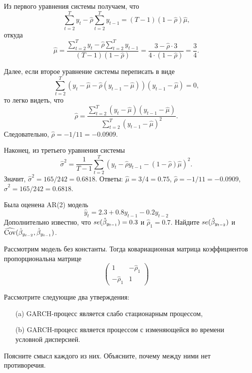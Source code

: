\documentclass[pdftex,11pt,openany]{book}\usepackage[]{graphicx}\usepackage[]{color}
\begin{document}
\begin{solution}
Из первого уравнения системы получаем, что
\[
\sum_{t=2}^{T}y_{t} - \hat{\rho} \sum_{t=2}^{T}y_{t-1} = (T - 1) (1- \hat{\rho}) \hat{\mu} \text{,}
\]
откуда
\[
\hat{\mu} = \frac{\sum_{t=2}^{T}y_{t} - \hat{\rho} \sum_{t=2}^{T}y_{t-1}}{(T - 1) (1- \hat{\rho})} = \frac{3 - \hat{\rho} \cdot 3}{4\cdot(1-\hat{\rho})} = \frac{3}{4} \text{.}
\]

Далее, если второе уравнение системы переписать в виде
\[
\sum_{t=2}^{T}(y_t - \hat{\mu} - \hat{\rho} (y_{t-1} - \hat{\mu}))(y_{t-1} - \hat{\mu}) = 0 \text{,}
\]
то легко видеть, что
\[
\hat{\rho} = \frac{\sum_{t=2}^{T}(y_t - \hat{\mu})(y_{t-1} - \hat{\mu})}{\sum_{t=2}^{T}(y_{t-1} - \hat{\mu})^2} \text{.}
\]
Следовательно, $\hat{\rho} =-1/11= -0.0909$.

Наконец, из третьего уравнения системы
\[
\hat{\sigma}^2 =\frac{1}{T-1} \sum_{t=2}^{T}(y_t - \hat{\rho} y_{t-1} - (1 - \hat{\rho}) \hat{\mu})^2 \text{.}
\]
Значит, $\hat{\sigma}^2 = 165/242= 0.6818$. Ответы: $\hat{\mu} = 3/4= 0.75$, $\hat{\rho} = -1/11=-0.0909$, $\hat{\sigma}^2 =165/242=0.6818$.
\end{solution}


\begin{problem}
Была оценена AR(2) модель
\[
\hat{y}_t=2.3+0.8 y_{t-1}-0.2 y_{t-2}
\]
Дополнительно известно, что $se(\hat{\beta}_{y_{t-1}})=0.3$ и $\hat{\rho}_1=0.7$. Найдите $se(\hat{\beta}_{y_{t-2}})$ и $\widehat{\operatorname{Cov}}(\hat{\beta}_{y_{t-2}},\hat{\beta}_{y_{t-1}})$.
\end{problem}

\begin{solution}
Рассмотрим модель без константы. Тогда ковариационная матрица коэффициентов пропорциональна матрице
\[
\begin{pmatrix}
1 & -\hat{\rho}_1 \\
-\hat{\rho}_1 & 1
\end{pmatrix}
\]
\end{solution}



\begin{problem}
Рассмотрите следующие два утверждения:
\begin{itemize}
  \item[(a)] GARCH-процесс является слабо стационарным процессом,
  \item[(b)] GARCH-процесс является процессом с изменяющейся во времени условной дисперсией.
\end{itemize}
Поясните смысл каждого из них. Объясните, почему между ними нет противоречия.
\end{problem}
\end{document}
